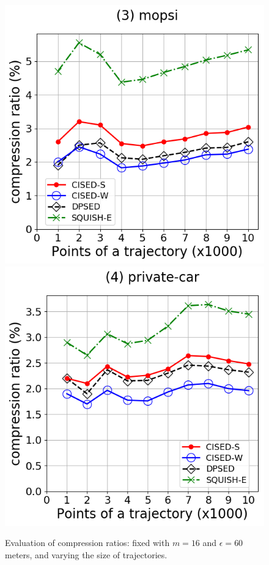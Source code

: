 {\begin{figure}[tb!]
\includegraphics[scale = 0.2900]{Figures/Exp-CR-size-mopsi.png}\hspace{1ex}
\includegraphics[scale = 0.2900]{Figures/Exp-CR-size-private.png}
\caption{\small Evaluation of compression ratios: fixed with $m=16$ and $\epsilon=60$ meters, and varying the size of trajectories.}
\label{fig:cr-size}
\vspace{-1ex}
\end{figure}




}

